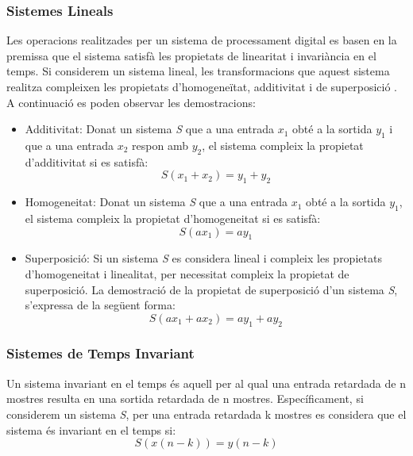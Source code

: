 \subsubsection{Sistemes Lineals}
\par Les operacions realitzades per un sistema de processament digital es basen en la premissa que el sistema satisfà les propietats de linearitat i invariància en el temps. Si considerem un sistema lineal, les transformacions que aquest sistema realitza compleixen les propietats d'homogeneïtat, additivitat i de superposició \cite{DiscreteTimeSP}. A continuació es poden observar les demostracions:
\begin{itemize}
    \item Additivitat: Donat un sistema \textit{S} que a una entrada $x_1$ obté a la sortida $y_1$ i que a una entrada $x_2$ respon amb $y_2$, el sistema compleix la propietat d'additivitat si es satisfà:
    \begin{equation}\label{additivity_eq}
        S(x_1 + x_2) = y_1 + y_2
    \end{equation}
    \item Homogeneitat: Donat un sistema \textit{S} que a una entrada $x_1$ obté a la sortida $y_1$, el sistema compleix la propietat d'homogeneitat si es satisfà:
    \begin{equation}\label{homogeneity_eq}
        S(ax_1) = ay_1
    \end{equation}
    \item Superposició: Si un sistema \textit{S} es considera lineal i compleix les propietats d'homogeneitat i linealitat, per necessitat compleix la propietat de superposició. La demostració de la propietat de superposició d'un sistema \textit{S}, s'expressa de la següent forma:
    \begin{equation}
        S(ax_1+ax_2) = ay_1 + ay_2
    \end{equation}
\end{itemize}


\subsubsection{Sistemes de Temps Invariant}
\par  Un sistema invariant en el temps és aquell per al qual una entrada retardada de n mostres resulta en una sortida retardada de n mostres. Específicament, si considerem un sistema \textit{S}, per una entrada retardada k mostres es considera que el sistema és invariant en el temps si:  
\begin{equation}
    S(x(n-k)) = y(n-k)
\end{equation}


